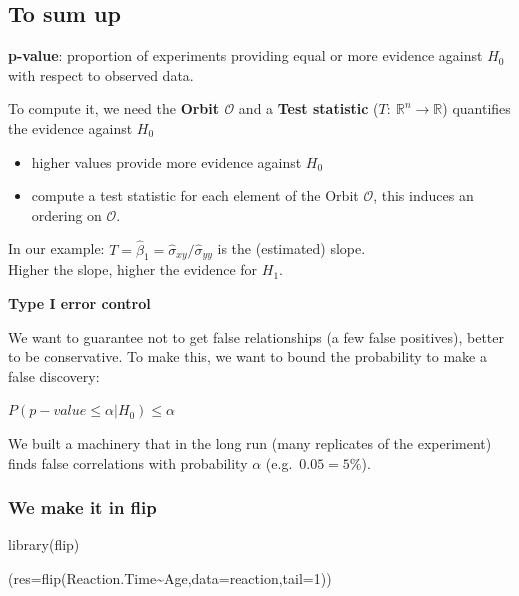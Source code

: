 \documentclass[
]{article}
\newenvironment{Shaded}{\begin{snugshade}}{\end{snugshade}}
\newcommand{\AttributeTok}[1]{\textcolor[rgb]{0.77,0.63,0.00}{#1}}
\newcommand{\DecValTok}[1]{\textcolor[rgb]{0.00,0.00,0.81}{#1}}
\newcommand{\FunctionTok}[1]{\textcolor[rgb]{0.00,0.00,0.00}{#1}}
\newcommand{\NormalTok}[1]{#1}
\newcommand{\SpecialCharTok}[1]{\textcolor[rgb]{0.00,0.00,0.00}{#1}}
\providecommand{\tightlist}{%
  \setlength{\itemsep}{0pt}\setlength{\parskip}{0pt}}
\begin{document}
\hypertarget{to-sum-up}{%
\subsection{To sum up}\label{to-sum-up}}

\textbf{p-value}: proportion of experiments providing equal or more
evidence against \(H_0\) with respect to observed data.

To compute it, we need the \textbf{Orbit \(\mathcal{O}\)} and a
\textbf{Test statistic} (\(T:\ \mathbb{R}^n\to\mathbb{R}\)) quantifies
the evidence against \(H_0\)

\begin{itemize}
\tightlist
\item
  higher values provide more evidence against \(H_0\)
\item
  compute a test statistic for each element of the Orbit
  \(\mathcal{O}\), this induces an ordering on \(\mathcal{O}\).
\end{itemize}

In our example: \(T=\hat\beta_1=\hat\sigma_{xy}/\hat\sigma_{yy}\) is the
(estimated) slope.\\
Higher the slope, higher the evidence for \(H_1\).

\textbf{Type I error control}

We want to guarantee not to get false relationships (a few false
positives), better to be conservative. To make this, we want to bound
the probability to make a false discovery:

\(P (p-value \leq \alpha | H_0) \leq \alpha\)

We built a machinery that in the long run (many replicates of the
experiment) finds false correlations with probability \(\alpha\)
(e.g.~\(0.05=5\%\)).

\hypertarget{we-make-it-in-flip}{%
\subsubsection{We make it in flip}\label{we-make-it-in-flip}}

\begin{Shaded}
\begin{Highlighting}[]
\FunctionTok{library}\NormalTok{(flip)}

\NormalTok{(}\AttributeTok{res=}\FunctionTok{flip}\NormalTok{(Reaction.Time}\SpecialCharTok{\textasciitilde{}}\NormalTok{Age,}\AttributeTok{data=}\NormalTok{reaction,}\AttributeTok{tail=}\DecValTok{1}\NormalTok{))}
\end{Highlighting}
\end{Shaded}
\end{document}
